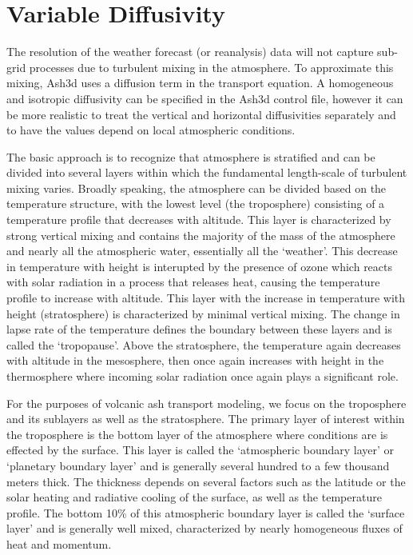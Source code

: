 \chapter{Variable Diffusivity}\label{ChapAppendVarDiff}
The resolution of the weather forecast (or reanalysis) data will not capture sub-grid
processes due to turbulent mixing in the atmosphere. To approximate this mixing, Ash3d
uses a diffusion term in the transport equation. A homogeneous and isotropic diffusivity
can be specified in the Ash3d control file, however it can be more realistic to 
treat the vertical and horizontal diffusivities separately and to have the values
depend on local atmospheric conditions.

The basic approach is to recognize that atmosphere is stratified and can be divided into
several layers within which the fundamental length-scale of turbulent mixing varies.
Broadly speaking, the atmosphere can be divided based on the temperature structure,
with the lowest level (the troposphere) consisting of a temperature profile that
decreases with altitude. This layer is characterized by strong vertical mixing and
contains the majority of the mass of the atmosphere and nearly all the atmospheric
water, essentially all the `weather'. This decrease in temperature with height is
interupted by the presence of ozone which reacts with solar radiation in a process that
releases heat, causing the temperature profile to increase with altitude. This layer
with the increase in temperature with height (stratosphere) is characterized by
minimal vertical mixing.
The change in lapse rate of the temperature defines the boundary between these layers
and is called the `tropopause'. Above the stratosphere, the temperature again decreases with
altitude in the mesosphere, then once again increases with height in the thermosphere
where incoming solar radiation once again plays a significant role.

For the purposes of volcanic ash transport modeling, we focus on the troposphere and
its sublayers as well as the stratosphere.
The primary layer of interest within the troposphere is the bottom layer
of the atmosphere where conditions are 
is effected by the surface. This layer is called the `atmospheric boundary layer' or
`planetary boundary layer' and is generally several hundred to a few thousand meters thick.
The thickness depends on several factors such as the latitude or the solar heating and
radiative cooling of the surface, as well as the temperature profile.
The bottom 10\% of this atmospheric boundary layer is called the `surface layer' and 
is generally well mixed, characterized by nearly homogeneous fluxes of heat and momentum.

